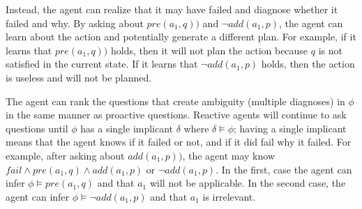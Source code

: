 \documentclass[letterpaper]{article}
\begin{document}
Instead, the agent can realize that it may have failed and diagnose whether it
failed and why.  By asking about $pre(a_1, q))$ and
$\neg add(a_1, p)$, the agent can learn about the action and potentially
generate a different plan.  For example, if it learns that $pre(a_1, q))$ holds,
then it will not plan the action because $q$ is not satisfied in the current
state.  If it learns that $\neg add(a_1, p)$ holds, then the action is useless
and will not be planned.

The agent can rank the questions that create ambiguity (multiple diagnoses) in
$\phi$ in the same manner as proactive questions.  Reactive agents will continue
to ask questions until $\phi$ has a single implicant $\delta$ where $\delta
\models \phi$; having a single implicant means that the agent knows if it failed
or not, and if it did fail why it failed.  For example, after asking about
$add(a_1, p))$, the agent may know $fail \wedge pre(a_1, q) \wedge
add(a_1, p)$ or $\neg add(a_1, p)$.  In the first, case the agent can infer
$\phi \models pre(a_1, q)$ and that $a_1$ will not be applicable.  In the second
case, the agent can infer $\phi \models \neg add(a_1, p)$ and that $a_1$ is
irrelevant.


% 
\end{document}
